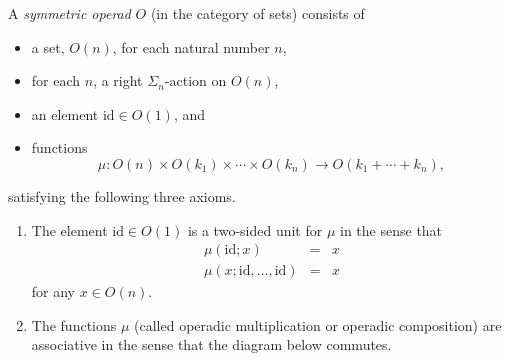 \documentclass{amsbook} %
\numberwithin{section}{chapter}
\begin{document}
\begin{Defi}
A \textit{symmetric operad} $O$ (in the category of sets) consists of
\begin{itemize}
\item a set, $O(n)$, for each natural number $n$,
\item for each $n$, a right $\Sigma_{n}$-action on $O(n)$,
\item an element $\textrm{id} \in O(1)$, and
\item functions
\[
\mu \colon  O(n) \times O(k_{1}) \times \cdots \times O(k_{n}) \rightarrow O(k_{1} + \cdots + k_{n}),
\]
\end{itemize}
satisfying the following three axioms.
\begin{enumerate}
\item The element $\textrm{id} \in O(1)$ is a two-sided unit for $\mu$ in the sense that
\[
\begin{array}{rcl}
\mu(\textrm{id}; x) & = & x \\
\mu(x; \textrm{id}, \ldots, \textrm{id}) & = & x
\end{array}
\]
for any $x \in O(n)$.
\item The functions $\mu$ (called operadic multiplication or operadic composition) are associative in the sense that the diagram below commutes.


\end{enumerate}
\end{Defi}
\end{document}
